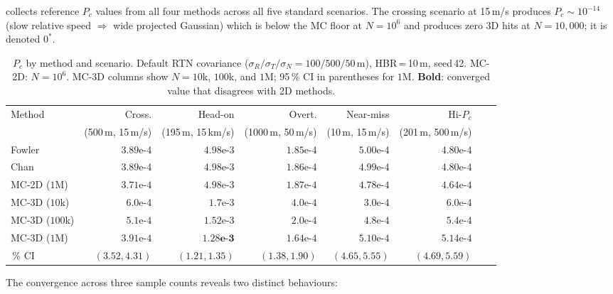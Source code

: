 \documentclass[11pt]{article}
\begin{document}
 collects reference $P_c$ values from all four methods
across all five standard scenarios.  The crossing scenario at 15\,m/s produces
$P_c \sim 10^{-14}$ (slow relative speed $\Rightarrow$ wide projected Gaussian)
which is below the MC floor at $N = 10^6$ and produces zero 3D hits at
$N = 10{,}000$; it is denoted $0^*$.

\begin{table}[htb]
\centering
\small
\caption{$P_c$ by method and scenario.  Default RTN covariance
  ($\sigma_R/\sigma_T/\sigma_N = 100/500/50$\,m), HBR\,=\,10\,m, seed\,42.
  MC-2D: $N=10^6$.  MC-3D columns show $N=10$k, $100$k, and $1$M;
  95\,\% CI in parentheses for $1$M.
  \textbf{Bold}: converged value that disagrees with 2D methods.}
\label{tab:all_methods}
\setlength{\tabcolsep}{4pt}
\begin{tabular}{lrrrrrrr}
  \toprule
  Method
    & Cross. & Head-on & Overt. & Near-miss & Hi-$P_c$ \\
  & \footnotesize(500\,m, 15\,m/s)
  & \footnotesize(195\,m, 15\,km/s)
  & \footnotesize(1000\,m, 50\,m/s)
  & \footnotesize(10\,m, 15\,m/s)
  & \footnotesize(201\,m, 500\,m/s) \\
  \midrule
  Fowler           & $3.89\text{e-}4$ & $4.98\text{e-}3$ & $1.85\text{e-}4$ & $5.00\text{e-}4$ & $4.80\text{e-}4$ \\
  Chan             & $3.89\text{e-}4$ & $4.98\text{e-}3$ & $1.86\text{e-}4$ & $4.99\text{e-}4$ & $4.80\text{e-}4$ \\
  MC-2D ($1$M)     & $3.71\text{e-}4$ & $4.98\text{e-}3$ & $1.87\text{e-}4$ & $4.78\text{e-}4$ & $4.64\text{e-}4$ \\
  \midrule
  MC-3D ($10$k)    & $6.0\text{e-}4$  & $1.7\text{e-}3$  & $4.0\text{e-}4$  & $3.0\text{e-}4$  & $6.0\text{e-}4$  \\
  MC-3D ($100$k)   & $5.1\text{e-}4$  & $1.52\text{e-}3$ & $2.0\text{e-}4$  & $4.8\text{e-}4$  & $5.4\text{e-}4$  \\
  MC-3D ($1$M)     & $3.91\text{e-}4$ & $\mathbf{1.28\text{e-}3}$ & $1.64\text{e-}4$ & $5.10\text{e-}4$ & $5.14\text{e-}4$ \\
  \quad 95\,\% CI  & $(3.52, 4.31)$   & $\mathbf{(1.21, 1.35)}$   & $(1.38, 1.90)$   & $(4.65, 5.55)$   & $(4.69, 5.59)$   \\
  \bottomrule
\end{tabular}
\end{table}

The convergence across three sample counts reveals two distinct behaviours:
\end{document}
